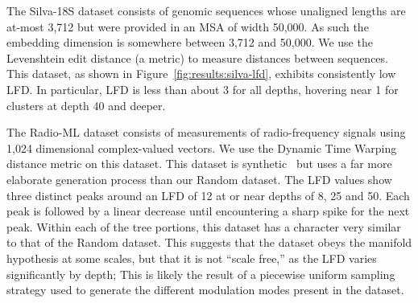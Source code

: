 The Silva-18S dataset consists of genomic sequences whose unaligned lengths are at-most 3,712 but were provided in an MSA of width 50,000.
As such the embedding dimension is somewhere between 3,712 and 50,000.
We use the Levenshtein edit distance (a metric) to measure distances between sequences.
This dataset, as shown in Figure~\ref{fig:results:silva-lfd}, exhibits consistently low LFD.
In particular, LFD is less than about 3 for all depths, hovering near 1 for clusters at depth 40 and deeper.

The Radio-ML dataset consists of measurements of radio-frequency signals using 1,024 dimensional complex-valued vectors.
We use the Dynamic Time Warping distance metric on this dataset.
This dataset is synthetic~\cite{oshea2018radioml} but uses a far more elaborate generation process than our Random dataset.
The LFD values show three distinct peaks around an LFD of 12 at or near depths of 8, 25 and 50.
Each peak is followed by a linear decrease until encountering a sharp spike for the next peak.
Within each of the tree portions, this dataset has a character very similar to that of the Random dataset.
This suggests that the dataset obeys the manifold hypothesis at some scales, but that it is not ``scale free,'' as the LFD varies significantly by depth;
This is likely the result of a piecewise uniform sampling strategy used to generate the different modulation modes present in the dataset.

